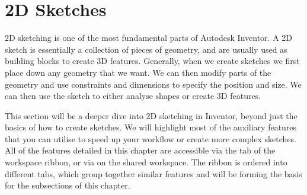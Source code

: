 \chapter{2D Sketches}

2D sketching is one of the most fundamental parts of Autodesk Inventor. A 2D sketch is essentially a collection of pieces of geometry, and are usually used as building blocks to create 3D features. Generally, when we create sketches we first place down any geometry that we want. We can then modify parts of the geometry and use constraints and dimensions to specify the position and size. We can then use the sketch to either analyse shapes or create 3D features.

This section will be a deeper dive into 2D sketching in Inventor, beyond just the basics of how to create sketches. We will highlight most of the auxiliary features that you can utilise to speed up your workflow or create more complex sketches. All of the features detailed in this chapter are accessible via the  tab of the workspace ribbon, or via  on the shared workspace. The ribbon is ordered into different tabs, which group together similar features and will be forming the basis for the subsections of this chapter.

